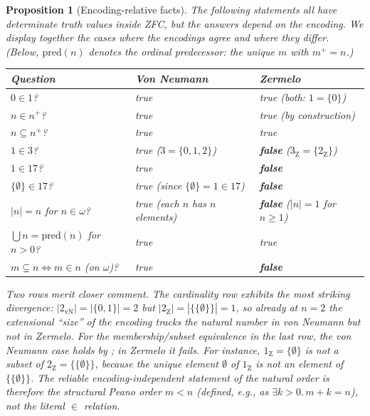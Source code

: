 \documentclass[12pt]{article}
\newtheorem{proposition}[theorem]{Proposition}
\theoremstyle{definition}
\theoremstyle{remark}
\begin{document}
\begin{proposition}[Encoding-relative facts]\label{prop:junk}
The following statements all have determinate truth values inside ZFC, but
the answers depend on the encoding. We display together the cases where the
encodings agree and where they differ. (Below, $\mathrm{pred}(n)$ denotes
the ordinal predecessor: the unique $m$ with $m^+ = n$.)
\begin{center}
\begin{tabular}{lll}
\textbf{Question} & \textbf{Von Neumann} & \textbf{Zermelo} \\\hline
$0 \in 1$? & true & true (both: $1 = \{0\}$) \\
$n \in n^+$? & true & true (by construction) \\
$n \subseteq n^+$? & true & true \\
$1 \in 3$? & true ($3 = \{0,1,2\}$) & \textbf{false} ($3_{\mathrm{Z}} = \{2_{\mathrm{Z}}\}$) \\
$1 \in 17$? & true & \textbf{false} \\
$\{\emptyset\} \in 17$? & true (since $\{\emptyset\} = 1 \in 17$) & \textbf{false} \\
$|n| = n$ for $n \in \omega$? & true (each $n$ has $n$ elements) & \textbf{false} ($|n|=1$ for $n \geq 1$) \\
$\bigcup n = \mathrm{pred}(n)$ for $n>0$? & true & true \\
$m \subsetneq n \iff m \in n$ (on $\omega$)? & true & \textbf{false}
\end{tabular}
\end{center}

Two rows merit closer comment. The cardinality row exhibits the most
striking divergence: $|2_{\mathrm{vN}}| = |\{0,1\}| = 2$ but
$|2_{\mathrm{Z}}| = |\{\{\emptyset\}\}| = 1$, so already at $n=2$ the
extensional ``size'' of the encoding tracks the natural number in von
Neumann but not in Zermelo. For the membership/subset equivalence in the
last row, the von Neumann case holds by ; in
Zermelo it fails. For instance, $1_{\mathrm{Z}} = \{\emptyset\}$ is not a
subset of $2_{\mathrm{Z}} = \{\{\emptyset\}\}$, because the unique element
$\emptyset$ of $1_{\mathrm{Z}}$ is not an element of
$\{\{\emptyset\}\}$. The reliable encoding-independent statement of the
natural order is therefore the structural Peano order $m < n$ (defined,
e.g., as $\exists k > 0.\, m + k = n$), not the literal $\in$ relation.
\end{proposition}
\end{document}
